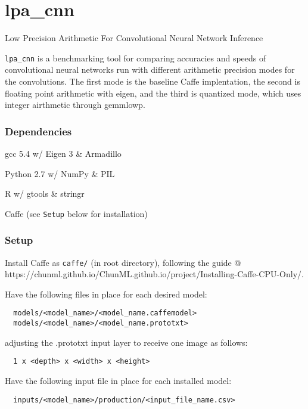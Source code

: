 \section{\texorpdfstring{lpa\_cnn}{lpa\_cnn}}\label{lpaux5fcnn}

Low Precision Arithmetic For Convolutional Neural Network Inference

\texttt{lpa\_cnn} is a benchmarking tool for comparing accuracies and
speeds of convolutional neural networks run with different arithmetic
precision modes for the convolutions. The first mode is the baseline
Caffe implentation, the second is floating point arithmetic with eigen,
and the third is quantized mode, which uses integer airthmetic through
gemmlowp.

\subsubsection{\texorpdfstring{Dependencies}{Dependencies}}\label{dependencies}

gcc 5.4 w/ Eigen 3 \& Armadillo

Python 2.7 w/ NumPy \& PIL

R w/ gtools \& stringr

Caffe (see \texttt{Setup} below for installation)

\subsubsection{\texorpdfstring{Setup}{Setup}}\label{setup}

Install Caffe as \texttt{caffe/} (in root directory), following the
guide @
https://chunml.github.io/ChunML.github.io/project/Installing-Caffe-CPU-Only/.

Have the following files in place for each desired model:

\begin{verbatim}
  models/<model_name>/<model_name.caffemodel>
  models/<model_name>/<model_name.prototxt>
\end{verbatim}

adjusting the .prototxt input layer to receive one image as follows:

\begin{verbatim}
  1 x <depth> x <width> x <height>
\end{verbatim}

Have the following input file in place for each installed model:

\begin{verbatim}
  inputs/<model_name>/production/<input_file_name.csv>
\end{verbatim}

